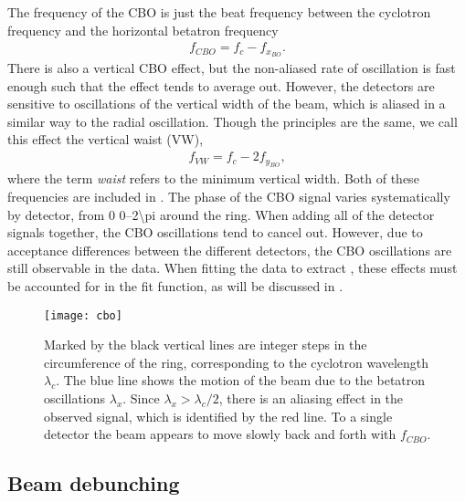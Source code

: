The frequency of the CBO is just the beat frequency between the cyclotron frequency and the horizontal betatron frequency
        \begin{align}
            f_{CBO} = f_{c}-f_{x_{BO}}.
        \end{align}
There is also a vertical CBO effect, but the non-aliased rate of oscillation is fast enough such that the effect tends to average out. However, the detectors are sensitive to oscillations of the vertical width of the beam, which is aliased in a similar way to the radial oscillation. Though the principles are the same, we call this effect the vertical waist (VW),
        \begin{align}
            f_{VW} = f_{c}-2f_{y_{BO}},
        \end{align}
where the term \textit{waist} refers to the minimum vertical width. Both of these frequencies are included in . The phase of the CBO signal varies systematically by detector, from 0 \SIrange{0}{2\pi}{} around the ring. When adding all of the detector signals together, the CBO oscillations tend to cancel out. However, due to acceptance differences between the different detectors, the CBO oscillations are still observable in the data. When fitting the data to extract \wa, these effects must be accounted for in the fit function, as will be discussed in .


\begin{figure}[]
    \centering
    \texttt{[image: cbo]}
    \caption[Coherent betatron oscillation]{Marked by the black vertical lines are integer steps in the circumference of the ring, corresponding to the cyclotron wavelength $\lambda_{c}$. The blue line shows the motion of the beam due to the betatron oscillations $\lambda_{x}$. Since $\lambda_{x} > \lambda_{c}/2$, there is an aliasing effect in the observed signal, which is identified by the red line. To a single detector the beam appears to move slowly back and forth with $f_{CBO}$.}
    \label{fig:cbo}
\end{figure}


\subsection{Beam debunching}
\label{sub:beam_debunching}

